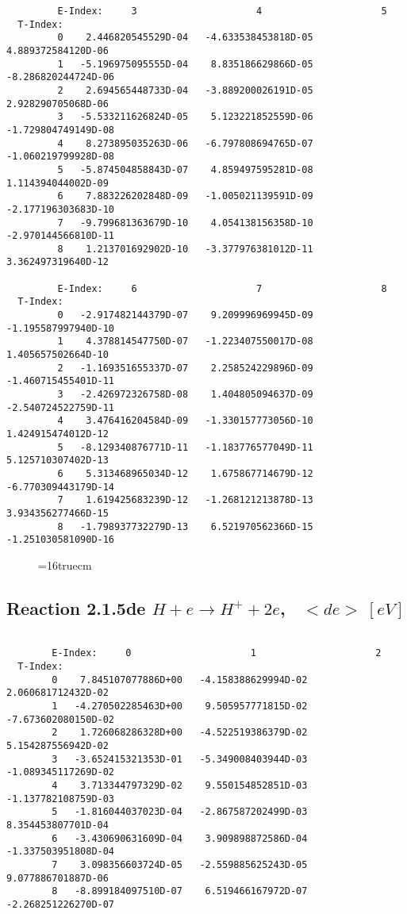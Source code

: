\documentclass[12pt,dvipdfmx]{article}
\begin{document}
{\begin{small}
\begin{verbatim}
         E-Index:     3                     4                     5
  T-Index:
         0    2.446820545529D-04   -4.633538453818D-05    4.889372584120D-06
         1   -5.196975095555D-04    8.835186629866D-05   -8.286820244724D-06
         2    2.694565448733D-04   -3.889200026191D-05    2.928290705068D-06
         3   -5.533211626824D-05    5.123221852559D-06   -1.729804749149D-08
         4    8.273895035263D-06   -6.797808694765D-07   -1.060219799928D-08
         5   -5.874504858843D-07    4.859497595281D-08    1.114394044002D-09
         6    7.883226202848D-09   -1.005021139591D-09   -2.177196303683D-10
         7   -9.799681363679D-10    4.054138156358D-10   -2.970144566810D-11
         8    1.213701692902D-10   -3.377976381012D-11    3.362497319640D-12

         E-Index:     6                     7                     8
  T-Index:
         0   -2.917482144379D-07    9.209996969945D-09   -1.195587997940D-10
         1    4.378814547750D-07   -1.223407550017D-08    1.405657502664D-10
         2   -1.169351655337D-07    2.258524229896D-09   -1.460715455401D-11
         3   -2.426972326758D-08    1.404805094637D-09   -2.540724522759D-11
         4    3.476416204584D-09   -1.330157773056D-10    1.424915474012D-12
         5   -8.129340876771D-11   -1.183776577049D-11    5.125710307402D-13
         6    5.313468965034D-12    1.675867714679D-12   -6.770309443179D-14
         7    1.619425683239D-12   -1.268121213878D-13    3.934356277466D-15
         8   -1.798937732279D-13    6.521970562366D-15   -1.251030581090D-16

\end{verbatim}\end{small}
\begin{figure} \label{2.1.5tot}
\epsfxsize=16truecm
\end{figure}

\newpage

\subsection{
Reaction 2.1.5de  $ H + e \rightarrow H^+ + 2e$, \   $<de> \ [eV]$}


\begin{small}\begin{verbatim}

        E-Index:     0                     1                     2
  T-Index:
        0    7.845107077886D+00   -4.158388629994D-02    2.060681712432D-02
        1   -4.270502285463D+00    9.505957771815D-02   -7.673602080150D-02
        2    1.726068286328D+00   -4.522519386379D-02    5.154287556942D-02
        3   -3.652415321353D-01   -5.349008403944D-03   -1.089345117269D-02
        4    3.713344797329D-02    9.550154852851D-03   -1.137782108759D-03
        5   -1.816044037023D-04   -2.867587202499D-03    8.354453807701D-04
        6   -3.430690631609D-04    3.909898872586D-04   -1.337503951808D-04
        7    3.098356603724D-05   -2.559885625243D-05    9.077886701887D-06
        8   -8.899184097510D-07    6.519466167972D-07   -2.268251226270D-07


\end{verbatim}
\end{small}}
\end{document}
